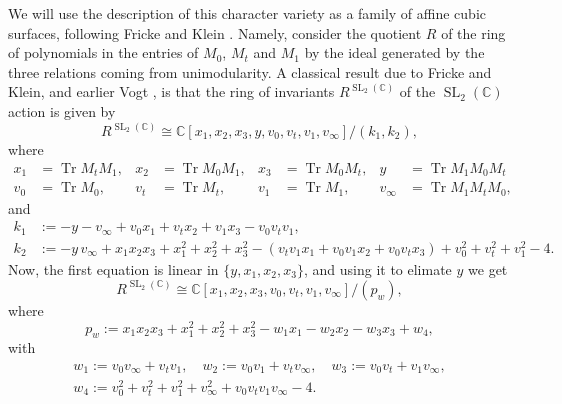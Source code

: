 \documentclass[a4paper,reqno]{amsart}
\numberwithin{equation}{section}
\newcommand{\C}{\mathbb{C}}
\DeclareMathOperator{\SL}{SL}
\numberwithin{equation}{section}
\begin{document}
We will use the description of this character variety as a family of affine cubic surfaces, following Fricke and Klein \cite{frickeklein}.
Namely, consider the quotient $R$ of the ring of polynomials in the entries of $M_0$, $M_t$ and $M_1$ by the ideal generated by the three relations coming from unimodularity. 
A classical result due to Fricke and Klein, and earlier Vogt \cite{vogt}, is that the ring of invariants $R^{\SL_2(\C)}$ of the $\SL_2(\C)$ action is given by 
$$R^{\SL_2(\C)} \cong \C[x_1,x_2,x_3,y,v_0,v_t,v_1,v_{\infty}] / (k_1,k_2),$$ 
where 
\begin{equation} \label{eq:pvitracesxv}
    \begin{aligned}
   x_1&=\operatorname{Tr} M_tM_1, &
   x_2&=\operatorname{Tr} M_0M_1, &
   x_3&=\operatorname{Tr} M_0M_t, &
   y&=\operatorname{Tr} M_1M_0M_t\\
   v_0&=\operatorname{Tr} M_0, & 
   v_t&=\operatorname{Tr} M_t, &
   v_1&=\operatorname{Tr} M_1, &
   v_\infty&=\operatorname{Tr} M_1M_tM_0,
\end{aligned}
\end{equation}
and 
\begin{align*}
k_1 &:= -y - v_\infty +  v_0 x_1+v_t x_2+v_1 x_3-v_0v_tv_1,\\
k_2 &:= -y\, v_\infty + x_1x_2x_3+x_1^2+x_2^2+x_3^2-(v_tv_1 x_1+v_0v_1x_2+v_0v_t x_3)+v_0^2+v_t^2+v_1^2-4.
\end{align*}
Now, the first equation is linear in $\{y,x_1,x_2,x_3\}$, and using it to elimate $y$ we get 
$$R^{\SL_2(\C)} \cong \C[x_1,x_2,x_3,v_0,v_t,v_1,v_{\infty}] / (p_w),$$
where
\begin{equation}
    p_w:=x_1x_2x_3
+x_1^2+x_2^2+x_3^2
-w_1 x_1-w_2x_2-w_3 x_3+w_4,\label{eq:pvicubic}
\end{equation}
with 
\begin{equation}
    \label{eq:pvi-om}
\begin{gathered}
     w_1:=v_0v_\infty+v_t v_1,\quad
    w_2:=v_0v_1+v_tv_\infty,\quad
    w_3:=v_0v_t+v_1v_\infty,\\  w_4:=v_0^2+v_t^2+v_1^2+v_\infty^2+v_0v_tv_1v_\infty-4.  
\end{gathered}
\end{equation}
\end{document}
